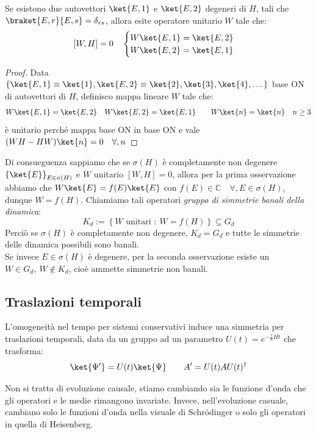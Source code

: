 \begin{remark}
    Se esistono due autovettori \(\ket{E,1}\) e \(\ket{E,2}\) degeneri di \(H\), tali che \(\braket{E,r}{E,s}= \delta_{rs}\),
    allora esite operatore unitario \(W\) tale che:
    \begin{equation}
        \left[ W, H \right]= 0 \quad \begin{cases}
                W\ket{E,1}= \ket{E,2}\\ W\ket{E,2}=\ket{E,1}
            \end{cases}
    \end{equation}
\end{remark}
\begin{proof}
    Data \(\left\{ \ket{E,1}\equiv \ket{1}, \ket{E,2}\equiv \ket{2}, \ket{3},\ket{4}, \dots  \right\}\) base ON di autovettori di \(H\), definisco mappa lineare \(W\) tale che:
    \[
        W\ket{E,1}= \ket{E,2} \quad  W\ket{E,2}=\ket{E,1} \qquad W\ket{n}= \ket{n} \quad n\geq 3
    \]
    è unitario perché mappa base ON in base ON e vale \((WH-HW)\ket{n}=0 \quad \forall,n\)
\end{proof}

Di consueguenza sappiamo che se \(\sigma(H)\) è completamente non degenere \(\left\{ \ket{E} \right\}_{E \in \sigma(H)}\) e \(W \) unitario \(\left[ W, H \right]=0\), 
allora per la prima osservazione abbiamo che \(W\ket{E}= f(E)\ket{E}\) con \(f(E)\in \mathbb{C} \quad \forall, E \in \sigma(H)\), dunque \(W = f(H)\). 
Chiamiamo tali operatori \textit{gruppo di simmetrie banali della dinamica}:
\begin{equation}
    K_d:= \left\{ W \text{ unitari } : \ W = f(H) \right\}   \subseteq G_d
\end{equation}
Perciò se \(\sigma(H)\) è completamente non degenere, \(K_d= G_d\)  e tutte le simmetrie delle dinamica possibili sono banali.\\
Se invece \(E \in \sigma(H)\) è degenere, per la seconda osservazione esiste un \(W \in G_d, \ W \notin K_d\), cioè ammette simmetrie non banali.


\subsection{Traslazioni temporali}
L'omogeneità nel tempo per sistemi conservativi induce una simmetria per traslazioni temporali, data da un gruppo ad un parametro \(U(t)= e^{-\frac{i}{\hbar}Ht}\) che trasforma:
\[
    \ket{\Psi'}= U(t)\ket{\Psi} \qquad A'=U(t)AU(t)^\dagger 
\]
\begin{attention}
    Non si tratta di evoluzione causale, stiamo cambiando sia le funzione d'onda che gli operatori e le medie rimangono invariate. 
    Invece, nell'evoluzione casuale, cambiano solo le funzioni d'onda nella visuale di Schrödinger o solo gli operatori in quella di Heisenberg.
\end{attention}


